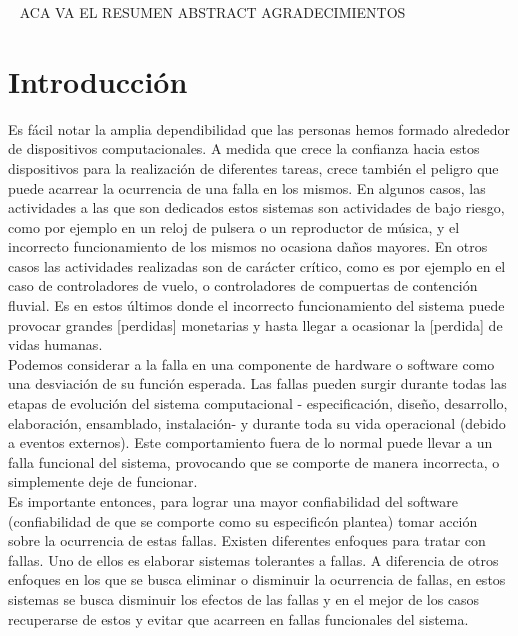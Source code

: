 \documentclass[titlepage, 12pt]{book}
\begin{document}

\newpage
~
\newpage
ACA VA EL RESUMEN
\newpage
ABSTRACT
\newpage
AGRADECIMIENTOS

\newpage
\tableofcontents

\newpage




\chapter{Introducci\'on}
\label{introduccion}

Es f\'acil notar la amplia dependibilidad que las personas hemos formado alrededor de dispositivos computacionales. A medida que crece la confianza hacia estos dispositivos para la realizaci\'on de diferentes tareas, crece tambi\'en el peligro que puede acarrear la ocurrencia de una falla en los mismos. En algunos casos, las actividades a las que son dedicados estos sistemas son actividades de bajo riesgo, como por ejemplo en un reloj de pulsera o un reproductor de m\'usica, y el incorrecto funcionamiento de los mismos no ocasiona da\~nos mayores. En otros casos las actividades realizadas son de car\'acter cr\'itico, como es por ejemplo en el caso de controladores de vuelo, o controladores de compuertas de contenci\'on fluvial. Es en estos \'ultimos donde el incorrecto funcionamiento del sistema puede provocar grandes [perdidas] monetarias y hasta llegar a ocasionar la [perdida] de vidas humanas.\\

Podemos considerar a la falla en una componente de hardware o software como una desviaci\'on de su funci\'on esperada. Las fallas pueden surgir durante todas las etapas de evoluci\'on del sistema computacional - especificaci\'on, dise\~no, desarrollo, elaboraci\'on, ensamblado, instalaci\'on- y durante toda su vida operacional\cite{faultInjection} (debido a eventos externos). Este comportamiento fuera de lo normal puede llevar a un falla funcional del sistema, provocando que se comporte de manera incorrecta, o simplemente deje de funcionar.\\
Es importante entonces, para lograr una mayor confiabilidad del software (confiabilidad de que se comporte como su especific\'on plantea) tomar acci\'on sobre la ocurrencia de estas fallas. Existen diferentes enfoques para tratar con fallas. Uno de ellos es elaborar sistemas tolerantes a fallas. A diferencia de otros enfoques en los que se busca eliminar o disminuir la ocurrencia de fallas, en estos sistemas se busca disminuir los efectos de las fallas y en el mejor de los casos recuperarse de estos y evitar que acarreen en fallas funcionales del sistema.\\
\end{document}
